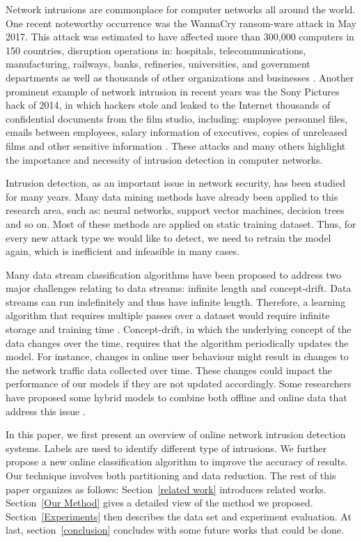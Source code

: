 \documentclass[runningheads]{llncs}
\begin{document}
	Network intrusions are commonplace for computer networks all around the world. One recent noteworthy occurrence was the WannaCry ransom-ware attack in May 2017. This attack was estimated to have affected more than 300,000 computers in 150 countries, disruption operations in: hospitals, telecommunications, manufacturing, railways, banks, refineries, universities, and government departments as well as thousands of other organizations and businesses \cite{Cameron2017}\cite{Hern2017}\cite{Eyerys2017}. Another prominent example of network intrusion in recent years was the Sony Pictures hack of 2014, in which hackers stole and leaked to the Internet thousands of confidential documents from the film studio, including: employee personnel files, emails between employees, salary information of executives, copies of unreleased films and other sensitive information \cite{Siboni2014}. These attacks and many others highlight the importance and necessity of intrusion detection in computer networks.
	
	Intrusion detection, as an important issue in network security, has been studied for many years. Many data mining methods have already been applied to this research area, such as: neural networks, support vector machines, decision trees and so on. Most of these methods are applied on static training dataset. Thus, for every new attack type we would like to detect, we need to retrain the model again, which is inefficient and infeasible in many cases.
	
	Many data stream classification algorithms have been proposed to address two major challenges relating to data streams: infinite length and concept-drift. Data streams can run indefinitely and thus have infinite length. Therefore, a learning algorithm that requires multiple passes over a dataset would require infinite storage and training time \cite{Siboni2014}. Concept-drift, in which the underlying concept of the data changes over the time, requires that the algorithm periodically updates the model. For instance, changes in online user behaviour might result in changes to the network traffic data collected over time. These changes could impact the performance of our models if they are not updated accordingly. Some researchers have proposed some hybrid models to combine both offline and online data that address this issue \cite{Siboni2014}\cite{Masud2013}. 
	
	In this paper, we first present an overview of online network intrusion detection systems. Labels are used to identify different type of intrusions. We further propose a new online classification algorithm to improve the accuracy of results. Our technique involves both partitioning and data reduction. The rest of this paper organizes as follows: Section~\ref{related work} introduces related works. Section~\ref{Our Method} gives a detailed view of the method we proposed. Section~\ref{Experiments} then describes the data set and experiment evaluation. At last, section~\ref{conclusion} concludes with some future works that could be done.
	
\end{document}
